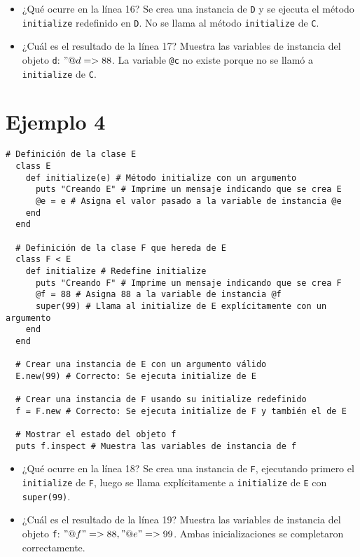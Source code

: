 \documentclass[a4paper,12pt]{article}
\begin{document}
  \begin{itemize}
    \item ¿Qué ocurre en la línea 16?  
          Se crea una instancia de \texttt{D} y se ejecuta el método \texttt{initialize} redefinido en \texttt{D}. No se llama al método \texttt{initialize} de \texttt{C}.
    \item ¿Cuál es el resultado de la línea 17?  
          Muestra las variables de instancia del objeto \texttt{d}: \texttt{\("@d=>88\)}. La variable \texttt{@c} no existe porque no se llamó a \texttt{initialize} de \texttt{C}.
  \end{itemize}

\section{Ejemplo 4}
\begin{lstlisting}[style=customruby]
  # Definición de la clase E
  class E
    def initialize(e) # Método initialize con un argumento
      puts "Creando E" # Imprime un mensaje indicando que se crea E
      @e = e # Asigna el valor pasado a la variable de instancia @e
    end
  end
  
  # Definición de la clase F que hereda de E
  class F < E
    def initialize # Redefine initialize
      puts "Creando F" # Imprime un mensaje indicando que se crea F
      @f = 88 # Asigna 88 a la variable de instancia @f
      super(99) # Llama al initialize de E explícitamente con un argumento
    end
  end
  
  # Crear una instancia de E con un argumento válido
  E.new(99) # Correcto: Se ejecuta initialize de E
  
  # Crear una instancia de F usando su initialize redefinido
  f = F.new # Correcto: Se ejecuta initialize de F y también el de E
  
  # Mostrar el estado del objeto f
  puts f.inspect # Muestra las variables de instancia de f
  \end{lstlisting}
  
  \begin{itemize}
    \item ¿Qué ocurre en la línea 18?  
          Se crea una instancia de \texttt{F}, ejecutando primero el \texttt{initialize} de \texttt{F}, luego se llama explícitamente a \texttt{initialize} de \texttt{E} con \texttt{super(99)}.
    \item ¿Cuál es el resultado de la línea 19?  
          Muestra las variables de instancia del objeto \texttt{f}: \texttt{\("@f"=>88, "@e"=>99\)}. Ambas inicializaciones se completaron correctamente.
  \end{itemize}
\end{document}
